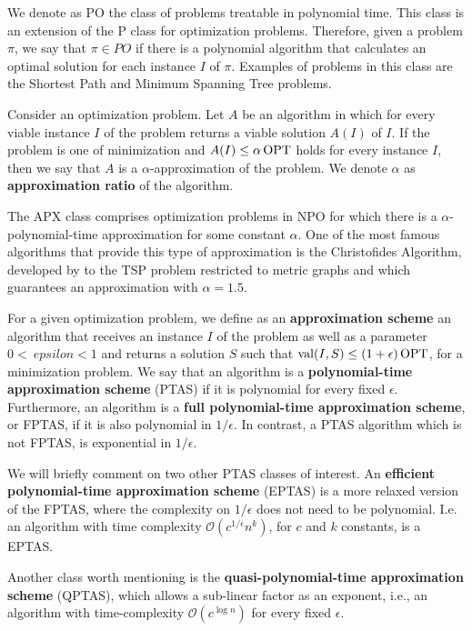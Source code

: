 We denote as PO the class of problems treatable in polynomial time. This class is an extension of the P class for optimization problems. Therefore, given a problem \(\pi\), we say that \(\pi \in PO\) if there is a polynomial algorithm that calculates an optimal solution for each instance \(I\) of \(\pi\). Examples of problems in this class are the Shortest Path and Minimum Spanning Tree problems.

Consider an optimization problem. Let \(A\) be an algorithm in which for every viable instance \(I\) of the problem returns a viable solution \(A(I)\) of \(I\). If the problem is one of minimization and \(A(I) \leq \alpha \operatorname{\textrm{OPT}}\) holds for every instance \(I\), then we say that \(A\) is a \(\alpha\)-approximation of the problem. We denote \(\alpha\) as \textbf{approximation ratio} of the algorithm.

The APX class comprises optimization problems in NPO for which there is a \(\alpha\)-polynomial-time approximation for some constant \(\alpha\). One of the most famous algorithms that provide this type of approximation is the Christofides Algorithm, developed by \cite{Christofides2022WorstCaseAO} to the TSP problem restricted to metric graphs and which guarantees an approximation with \(\alpha = 1.5\).

For a given optimization problem, we define as an \textbf{approximation scheme} an algorithm that receives an instance \(I\) of the problem as well as a parameter \(0 < \ epsilon < 1\) and returns a solution \(S\) such that \(\operatorname{\textrm{val}}(I, S) \leq (1 + \epsilon) \operatorname{\textrm{OPT}}\), for a minimization problem. We say that an algorithm is a \textbf{polynomial-time approximation scheme} (PTAS) if it is polynomial for every fixed \(\epsilon\). Furthermore, an algorithm is a \textbf{full polynomial-time approximation scheme}, or FPTAS, if it is also polynomial in \(1 / \epsilon\). In contrast, a PTAS algorithm which is not FPTAS, is exponential in \(1 / \epsilon\).

We will briefly comment on two other PTAS classes of interest. An \textbf{efficient polynomial-time approximation scheme} (EPTAS) is a more relaxed version of the FPTAS, where the complexity on \(1 / \epsilon\) does not need to be polynomial. I.e. an algorithm with time complexity \(\mathcal{O}(c^{1 / \epsilon} n^k)\), for \(c\) and \(k\) constants, is a EPTAS.

Another class worth mentioning is the \textbf{quasi-polynomial-time approximation scheme} (QPTAS), which allows a sub-linear factor as an exponent, i.e., an algorithm with time-complexity \(\mathcal{O}(c^{\log{n}})\) for every fixed \(\epsilon\).

